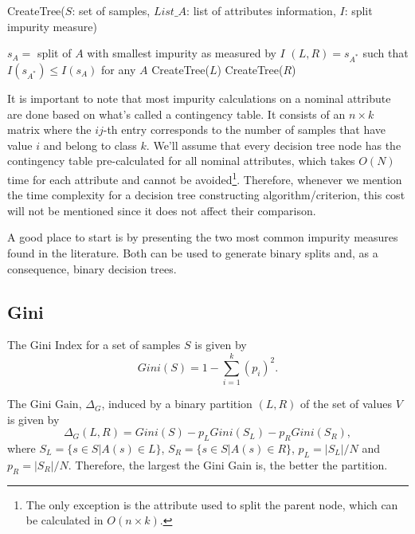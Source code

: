 \begin{algorithm}[tb]
   \caption{CreateTree($S$: set of samples, $List\_A$: list of attributes information, $I$: split impurity measure)}
   \label{alg:create-tree}
\begin{algorithmic}
\STATE $s_A = $ split of $A$ with smallest impurity as measured by $I$
\ENDFOR
\STATE $(L, R) = s_{A^*}$ such that $I(s_{A^*}) \leq I(s_A) $ for any $A$
\STATE CreateTree($L$)
\STATE CreateTree($R$)
\ENDIF
\end{algorithmic}
\end{algorithm}

It is important to note that most impurity calculations on a nominal attribute are done based on what's called a contingency table. It consists of an $n\times k$ matrix where the $ij$-th entry corresponds to the number of samples that have value $i$ and belong to class $k$. We'll assume that every decision tree node has the contingency table pre-calculated for all nominal attributes, which takes $O(N)$ time for each attribute and cannot be avoided\footnote{The only exception is the attribute used to split the parent node, which can be calculated in $O(n\times k)$.}. Therefore, whenever we mention the time complexity for a decision tree constructing algorithm/criterion, this cost will not be mentioned since it does not affect their comparison.

A good place to start is by presenting the two most common impurity measures found in the literature. Both can be used to generate binary splits
and, as a consequence, binary decision trees.

\subsection{Gini}
\label{subsec:Gini}
The Gini Index for a set of samples $S$ is given by 
\begin{equation}
 Gini(S) =  1- \sum_{i=1}^k (p_i)^2 .
\label{eq:gini}
\end{equation}

The Gini Gain, $\Delta_G$, induced by a binary partition $(L,R)$ 
of the set of values $V$ is
given by 
\begin{equation}
 \Delta_G (L,R) = Gini(S) -
p_L Gini(S_L) - p_R Gini(S_R),
\label{eq:Ginigain}
\end{equation}
where $S_L= \{ s \in S | A(s) \in L \}$, $S_R= \{ s \in S | A(s) \in R \}$,
 $p_L=|S_L| /N $
and $p_R=|S_R| /N$. Therefore, the largest the Gini Gain is, the better the partition.

